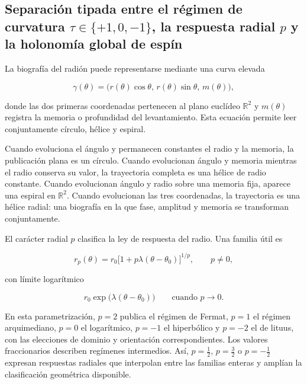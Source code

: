\subsection{Separación tipada entre el régimen de curvatura \(\tau\in\{+1,0,-1\}\), la respuesta radial \(p\) y la holonomía global de espín}

La biografía del radión puede representarse mediante una curva elevada

\[
\gamma(\theta)
=
\bigl(r(\theta)\cos\theta,\,
r(\theta)\sin\theta,\,
m(\theta)\bigr),
\]

donde las dos primeras coordenadas pertenecen al plano euclídeo \(\mathbb R^2\) y \(m(\theta)\) registra la memoria o profundidad del levantamiento. Esta ecuación permite leer conjuntamente círculo, hélice y espiral.

Cuando evoluciona el ángulo y permanecen constantes el radio y la memoria, la publicación plana es un círculo. Cuando evolucionan ángulo y memoria mientras el radio conserva su valor, la trayectoria completa es una hélice de radio constante. Cuando evolucionan ángulo y radio sobre una memoria fija, aparece una espiral en \(\mathbb R^2\). Cuando evolucionan las tres coordenadas, la trayectoria es una hélice radial: una biografía en la que fase, amplitud y memoria se transforman conjuntamente.

El carácter radial \(p\) clasifica la ley de respuesta del radio. Una familia útil es

\[
r_p(\theta)
=
r_0\bigl[1+p\lambda(\theta-\theta_0)\bigr]^{1/p},
\qquad p\neq 0,
\]

con límite logarítmico

\[
r_0\exp\bigl(\lambda(\theta-\theta_0)\bigr)
\qquad\text{cuando }p\to0.
\]

En esta parametrización, \(p=2\) publica el régimen de Fermat, \(p=1\) el régimen arquimediano, \(p=0\) el logarítmico, \(p=-1\) el hiperbólico y \(p=-2\) el de lituus, con las elecciones de dominio y orientación correspondientes. Los valores fraccionarios describen regímenes intermedios. Así, \(p=\tfrac12\), \(p=\tfrac32\) o \(p=-\tfrac12\) expresan respuestas radiales que interpolan entre las familias enteras y amplían la clasificación geométrica disponible.


